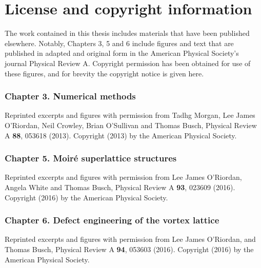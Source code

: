 \chapter*{License and copyright information}

The work contained in this thesis includes materials that have been published elsewhere. Notably, Chapters 3, 5 and 6 include figures and text that are published in adapted and original form in the American Physical Society's journal Physical Review A. Copyright permission has been obtained for use of these figures, and for brevity the copyright notice is given here.

\subsection*{Chapter 3. Numerical methods}
Reprinted excerpts and figures with permission from Tadhg Morgan, Lee James O'Riordan, Neil Crowley, Brian O'Sullivan and Thomas Busch, Physical Review A \textbf{88}, 053618 (2013). Copyright (2013) by the American Physical Society.

\subsection*{Chapter 5. Moir\'e superlattice structures}
Reprinted excerpts and figures with permission from Lee James O'Riordan, Angela White and Thomas Busch, Physical Review A \textbf{93}, 023609 (2016). Copyright (2016) by the American Physical Society.

\subsection*{Chapter 6. Defect engineering of the vortex lattice}
Reprinted excerpts and figures with permission from Lee James O’Riordan, and Thomas Busch, Physical Review A \textbf{94}, 053603 (2016). Copyright (2016) by the American Physical Society.
